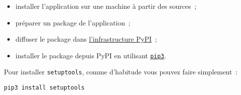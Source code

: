 \begin{itemize}
\tightlist
\item
  installer l'application sur une machine à partir des sources~;
\item
  préparer un package de l'application~;
\item
  diffuser le package dans
  \href{https://pypi.python.org/pypi}{l'infrastructure PyPI}~;
\item
  installer le package depuis PyPI en utilisant
  \href{http://pip.readthedocs.org/en/latest/installing.html}{\texttt{pip3}}.
\end{itemize}

    Pour installer \texttt{setuptools}, comme d'habitude vous pouvez faire
simplement~:

\begin{verbatim}
pip3 install setuptools
\end{verbatim}


    
    
    
